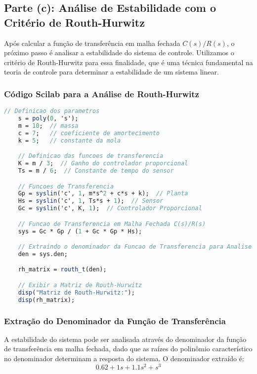
\subsection{Parte (c): Análise de Estabilidade com o Critério de Routh-Hurwitz}

Após calcular a função de transferência em malha fechada \(C(s)/R(s)\), o próximo passo é analisar a estabilidade do sistema de controle. Utilizamos o critério de Routh-Hurwitz para essa finalidade, que é uma técnica fundamental na teoria de controle para determinar a estabilidade de um sistema linear.


\subsubsection{Código Scilab para a Análise de Routh-Hurwitz}
\begin{lstlisting}[language=Scilab, caption=Código Scilab para calcular a matriz de Routh-Hurwitz]
    // Definicao dos parametros
    s = poly(0, 's');
    m = 10;  // massa
    c = 7;   // coeficiente de amortecimento
    k = 5;   // constante da mola

    // Definicao das funcoes de transferencia
    K = m / 3;  // Ganho do controlador proporcional
    Ts = m / 6;  // Constante de tempo do sensor

    // Funcoes de Transferencia
    Gp = syslin('c', 1, m*s^2 + c*s + k);  // Planta
    Hs = syslin('c', 1, Ts*s + 1);  // Sensor
    Gc = syslin('c', K, 1);  // Controlador Proporcional

    // Funcao de Transferencia em Malha Fechada C(s)/R(s)
    sys = Gc * Gp / (1 + Gc * Gp * Hs);

    // Extraindo o denominador da Funcao de Transferencia para Analise de Estabilidade
    den = sys.den;

    rh_matrix = routh_t(den);

    // Exibir a Matriz de Routh-Hurwitz
    disp("Matriz de Routh-Hurwitz:");
    disp(rh_matrix);
    \end{lstlisting}


\subsubsection{Extração do Denominador da Função de Transferência}

A estabilidade do sistema pode ser analisada através do denominador da função de transferência em malha fechada, dado que as raízes do polinômio característico no denominador determinam a resposta do sistema. O denominador extraído é:
\[ 0.62 + 1s + 1.1s^2 + s^3 \]


